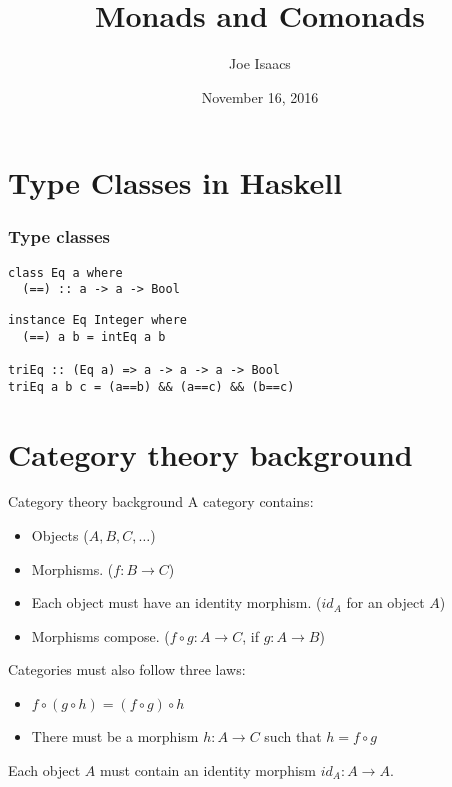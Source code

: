 \documentclass{beamer} %
\author{Joe Isaacs}
\title{Monads and Comonads}
\institute{Churchill CompSci talks}
\date{November 16, 2016}
\begin{document}
\begin{frame}
  \titlepage
\end{frame}

\section{Type Classes in Haskell}

\begin{frame}[fragile]\frametitle{Type classes}
\begin{verbatim}
class Eq a where
  (==) :: a -> a -> Bool
\end{verbatim}

\begin{verbatim}
instance Eq Integer where
  (==) a b = intEq a b

triEq :: (Eq a) => a -> a -> a -> Bool
triEq a b c = (a==b) && (a==c) && (b==c)
\end{verbatim}
\end{frame}

\section{Category theory background}

\begin{frame}{Category theory background}
  A category contains:
  \begin{itemize}
    \item Objects ($A,B,C,\dots$)

    \item Morphisms. ($f:B\rightarrow C$)

    \item Each object must have an identity morphism. ($id_A$ for an object $A$)

    \item Morphisms compose. ($f\circ g : A \rightarrow C$, if $g:A\rightarrow B$)
  \end{itemize}

  Categories must also follow three laws:

  \begin{itemize}
    \item $f \circ (g \circ h) = (f\circ g) \circ h$

    \item There must be a morphism $h:A\rightarrow C$ such
      that $h = f\circ g$


  \end{itemize}
  Each object $A$ must contain an identity morphism $\mathit{id}_A : A\rightarrow A$.
\end{frame}
\end{document}
